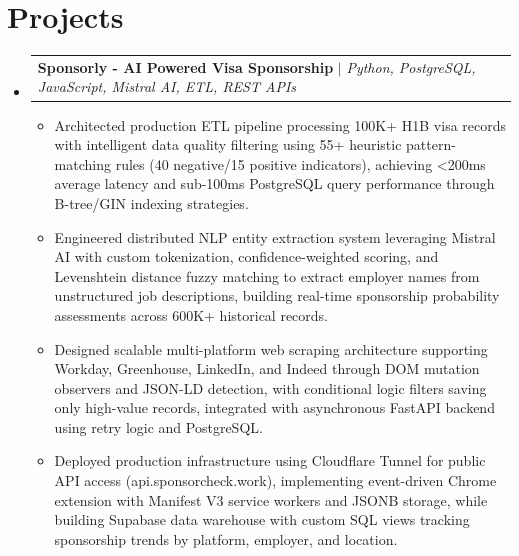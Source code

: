 \documentclass[letterpaper,10.5pt]{article}
\makeatletter
\newcommand{\resumeItem}[1]{
  \item\small{
    {#1 \vspace{-2pt}}
  }
}
\newcommand{\resumeProjectHeading}[2]{
    \item
    \begin{tabular*}{0.97\textwidth}{l@{\extracolsep{\fill}}r}
      \small#1 & #2 \\
    \end{tabular*}\vspace{-2pt}
}
\newcommand{\resumeSubHeadingListStart}{\begin{itemize}[leftmargin=0.15in, label={}]}
\newcommand{\resumeSubHeadingListEnd}{\end{itemize}}
\newcommand{\resumeItemListStart}{\begin{itemize}[topsep=0pt]}
\newcommand{\resumeItemListEnd}{\end{itemize}\vspace{2pt}}
\makeatother
\begin{document}
\section{Projects}
    \resumeSubHeadingListStart
      \resumeProjectHeading
          {\textbf{Sponsorly - AI Powered Visa Sponsorship} $|$ \emph{Python, PostgreSQL, JavaScript, Mistral AI, ETL, REST APIs}}{}
          \resumeItemListStart
            \resumeItem{
            Architected production ETL pipeline processing 100K+ H1B visa records with intelligent data quality filtering using 55+ heuristic pattern-matching rules (40 negative/15 positive indicators), achieving <200ms average latency and sub-100ms PostgreSQL query performance through B-tree/GIN indexing strategies.
            }
            \resumeItem{
            Engineered distributed NLP entity extraction system leveraging Mistral AI with custom tokenization, confidence-weighted scoring, and Levenshtein distance fuzzy matching to extract employer names from unstructured job descriptions, building real-time sponsorship probability assessments across 600K+ historical records.
            }
            \resumeItem{
            Designed scalable multi-platform web scraping architecture supporting Workday, Greenhouse, LinkedIn, and Indeed through DOM mutation observers and JSON-LD detection, with conditional logic filters saving only high-value records, integrated with asynchronous FastAPI backend using retry logic and PostgreSQL.
            }
            \resumeItem{
            Deployed production infrastructure using Cloudflare Tunnel for public API access (api.sponsorcheck.work), implementing event-driven Chrome extension with Manifest V3 service workers and JSONB storage, while building Supabase data warehouse with custom SQL views tracking sponsorship trends by platform, employer, and location.
            }
          \resumeItemListEnd
    \resumeSubHeadingListEnd

\vspace{-4pt}
\end{document}
